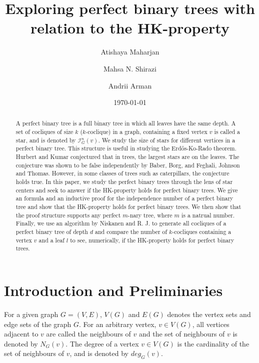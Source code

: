 \documentclass{amsart}
\title[]{Exploring perfect binary trees with relation to the HK-property}
\author[Atishaya Maharjan]{Atishaya Maharjan} \email[Atishaya Maharjan]{maharjaa@myumanitoba.ca}
\author[M.~N.~Shirazi]{Mahsa N. Shirazi} \email[M.~N.~Shirazi]{mahsa.nasrollahi@gmail.com}
\author[Andrii Arman]{Andrii Arman} \email[Andrii Arman]{andrii.arman@umanitoba.ca}
\date{\today}
\theoremstyle{definition}
\begin{document}
\begin{abstract}
	A perfect binary tree is a full binary tree in which all leaves have the same depth. A set of cocliques of size $k$ ($k$-coclique) in a graph, containing a fixed vertex $v$ is called a star, and is denoted by $\mathcal{I}^n_G(v)$. We study the size of stars for different vertices in a perfect binary tree. This structure is useful in studying the Erd\H{o}s-Ko-Rado theorem. Hurbert and Kumar conjectured that in trees, the largest stars are on the leaves. The conjecture was shown to be false independently by Baber, Borg, and Feghali, Johnson and Thomas. However, in some classes of trees such as caterpillars, the conjecture holds true. In this paper, we study the perfect binary trees through the lens of star centers and seek to answer if the HK-property holds for perfect binary trees. We give an formula and an inductive proof for the independence number of a perfect binary tree and show that the HK-property holds for perfect binary trees. We then show that the proof structure supports any perfect $m$-nary tree, where $m$ is a natrual number. Finally, we use an algorithm by Niskanen and R. J. to generate all cocliques of a perfect binary tree of depth $d$ and compare the number of $k$-cocliques containing a vertex $v$ and a leaf $l$ to see, numerically, if the HK-property holds for perfect binary trees.
\end{abstract}

\maketitle

\section{Introduction and Preliminaries}
For a given graph $G = (V,E)$, $V(G)$ and $E(G)$ denotes the vertex sets and edge sets of the graph $G$. For an arbitrary vertex, $v \in V(G)$, all vertices adjacent to $v$ are called the neighbours of $v$ and the set of neighbours of $v$ is denoted by $N_G(v)$. The degree of a vertex $v \in V(G)$ is the cardinality of the set of neighbours of $v$, and is denoted by $deg_G(v)$.
\end{document}
